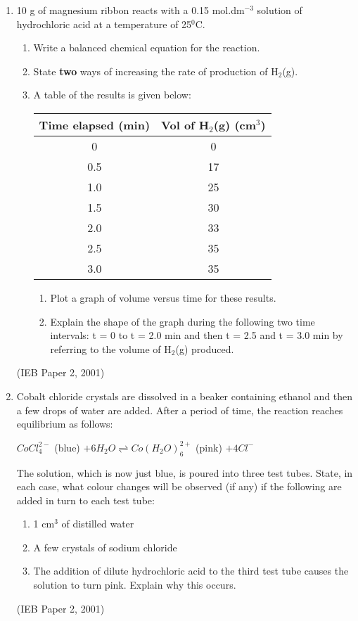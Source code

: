 {\begin{enumerate}
\item{10 g of magnesium ribbon reacts with a 0.15 mol.dm$^{-3}$ solution of hydrochloric acid at a temperature of 25$^{0}$C.
	\begin{enumerate}
	\item{Write a balanced chemical equation for the reaction.}
	\item{State \textbf{two} ways of increasing the rate of production of H$_{2}$(g).}
	\item{A table of the results is given below:}
\begin{center}
\begin{tabular}{|c|c|}\hline
\textbf{Time elapsed (min)} & \textbf{Vol of H$_{2}$(g) (cm$^{3}$)}\\\hline
0 & 0 \\\hline
0.5 & 17 \\\hline
1.0 & 25 \\\hline
1.5 & 30 \\\hline
2.0 & 33 \\\hline
2.5 & 35 \\\hline
3.0 & 35 \\\hline
\end{tabular}
\end{center}
		\begin{enumerate}
		\item{Plot a graph of volume versus time for these results.}
		\item{Explain the shape of the graph during the following two time intervals: t = 0 to t = 2.0 min and then t = 2.5 and t = 3.0 min by referring to the volume of H$_{2}$(g) produced.}
		\end{enumerate}
	\end{enumerate}
}
(IEB Paper 2, 2001)

\item{Cobalt chloride crystals are dissolved in a beaker containing ethanol and then a few drops of water are added. After a period of time, the reaction reaches equilibrium as follows:
\begin{center}
\rm${CoCl_{4}^{2-}}$ (blue) \rm${ + 6H_{2}O \rightleftharpoons Co(H_{2}O)_{6}^{2+}}$ (pink) \rm${ + 4Cl^{-}}$
\end{center}

The solution, which is now just blue, is poured into three test tubes. State, in each case, what colour changes will be observed (if any) if the following are added in turn to each test tube:

	\begin{enumerate}
	\item{1 cm$^{3}$ of distilled water}
	\item{A few crystals of sodium chloride}
	\item{The addition of dilute hydrochloric acid to the third test tube causes the solution to turn pink. Explain why this occurs.}
	\end{enumerate}
}
(IEB Paper 2, 2001)


\end{enumerate}
}









